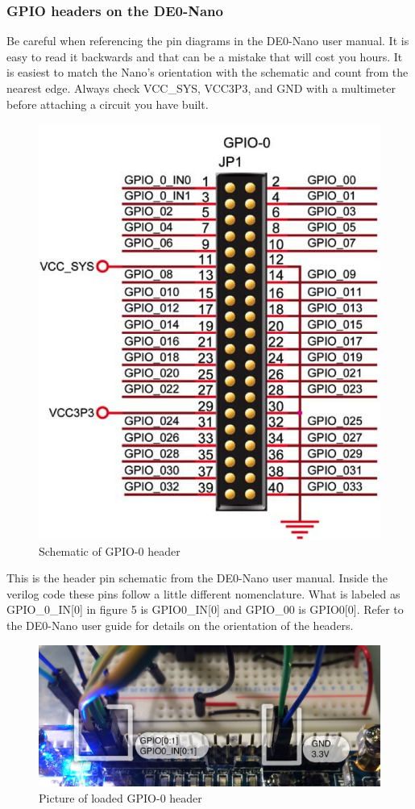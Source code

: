 \documentclass[12pt,journal]{IEEEtran}
\begin{document}
      \subsubsection{GPIO headers on the DE0-Nano}
        Be careful when referencing the pin diagrams in the DE0-Nano user manual. It is easy to read it backwards and
        that can be a mistake that will cost you hours. It is easiest to match the Nano's orientation with the schematic
        and count from the nearest edge. Always check VCC\_SYS, VCC3P3, and GND with a multimeter before attaching a circuit
        you have built. 
        \begin{figure}[H]
          \includegraphics[width=.48\textwidth]{Images/GPIOHeader.jpg}
          \caption{Schematic of GPIO-0 header\cite{DE0Manual}}
        \end{figure}
        This is the header pin schematic from the DE0-Nano user manual. Inside the verilog code these pins follow a little
        different nomenclature. What is labeled as GPIO\_0\_IN[0] in figure 5 is GPIO0\_IN[0] and GPIO\_00 is GPIO0[0]. Refer
        to the DE0-Nano user guide for details on the orientation of the headers.

        \begin{figure}[H]
          \includegraphics[width=.45\textwidth]{Images/GPIOpicture.jpg}
          \caption{Picture of loaded GPIO-0 header}
        \end{figure}
\end{document}
